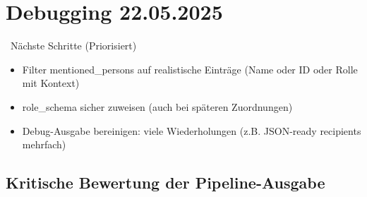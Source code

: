 \documentclass{article}
\begin{document}
\noindent\hrulefill
\section{Debugging \small 22.05.2025}

\faStepForward\ Nächste Schritte (Priorisiert)
\begin{itemize}
\item Filter mentioned\_persons auf realistische Einträge (Name oder ID oder Rolle mit Kontext)
\item role\_schema sicher zuweisen (auch bei späteren Zuordnungen)
\item Debug-Ausgabe bereinigen: viele Wiederholungen (z.B. JSON-ready recipients mehrfach)
\end{itemize}

\subsection*{Kritische Bewertung der Pipeline-Ausgabe}
\end{document}
